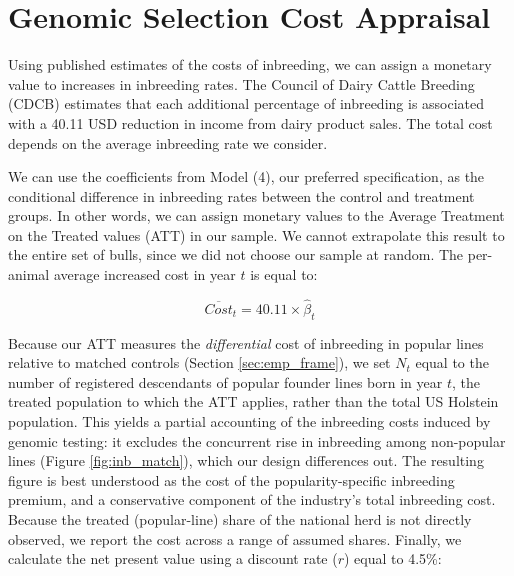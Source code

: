 \documentclass[12pt,letterpaper]{article}
\begin{document}


\newpage

\clearpage

\appendix

\section{Genomic Selection Cost Appraisal\label{sec:cost}}
Using published estimates of the costs of inbreeding, we can assign a monetary value to increases in inbreeding rates. The Council of Dairy Cattle Breeding (CDCB) estimates that each additional percentage of inbreeding is associated with a 40.11 USD reduction in income from dairy product sales. The total cost depends on the average inbreeding rate we consider.
 
We can use the coefficients from Model (4), our preferred specification, as the conditional difference in inbreeding rates between the control and treatment groups. In other words, we can assign monetary values to the Average Treatment on the Treated values (ATT) in our sample. We cannot extrapolate this result to the entire set of bulls, since we did not choose our sample at random. The per-animal average increased cost in year $t$ is equal to:

\begin{equation}
    \overline{Cost}_{t} = 40.11\times\hat{\beta}_{t}
\end{equation}

Because our ATT measures the \emph{differential} cost of inbreeding in popular lines relative to matched controls (Section \ref{sec:emp_frame}), we set $N_{t}$ equal to the number of registered descendants of popular founder lines born in year $t$, the treated population to which the ATT applies, rather than the total US Holstein population. This yields a partial accounting of the inbreeding costs induced by genomic testing: it excludes the concurrent rise in inbreeding among non-popular lines (Figure \ref{fig:inb_match}), which our design differences out. The resulting figure is best understood as the cost of the popularity-specific inbreeding premium, and a conservative component of the industry's total inbreeding cost. Because the treated (popular-line) share of the national herd is not directly observed, we report the cost across a range of assumed shares. Finally, we calculate the net present value using a discount rate ($r$) equal to 4.5\%:
\end{document}
